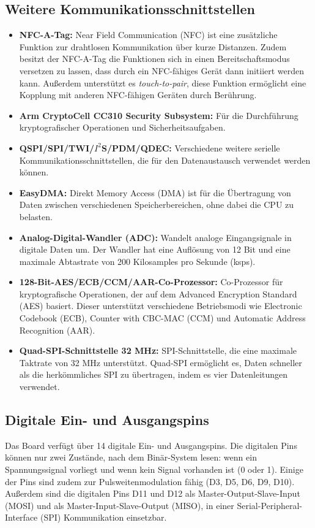 \subsection{Weitere Kommunikationsschnittstellen}
\cite{Ard.2024}\cite{NrdSem3.2024}
\begin{itemize}
	\item \textbf{NFC-A-Tag:} Near Field Communication (NFC) ist eine zusätzliche Funktion zur drahtlosen Kommunikation über kurze Distanzen. Zudem besitzt der NFC-A-Tag die Funktionen sich in einen Bereitschaftsmodus versetzen zu lassen, dass durch ein NFC-fähiges Gerät dann initiiert werden kann. Außerdem unterstützt es \textit{touch-to-pair}, diese Funktion ermöglicht eine Kopplung mit anderen NFC-fähigen Geräten durch Berührung.
	\item \textbf{Arm CryptoCell CC310 Security Subsystem:} Für die Durchführung kryptografischer Operationen und Sicherheitsaufgaben.\\ \cite{NrdSem.2024}
	\item \textbf{QSPI/SPI/TWI/$I^2$S/PDM/QDEC:} Verschiedene weitere serielle Kommunikationsschnittstellen, die für den Datenaustausch verwendet werden können.
	\item \textbf{EasyDMA:} Direkt Memory Access (DMA) ist für die Übertragung von Daten zwischen verschiedenen Speicherbereichen, ohne dabei die CPU zu belasten.\cite{Gehrke.2022}
	\item \textbf{Analog-Digital-Wandler (ADC):} Wandelt analoge Eingangsignale in digitale Daten um. Der Wandler hat eine Auflösung von 12 Bit und eine maximale Abtastrate von 200 Kilosamples pro Sekunde (ksps).
	\item \textbf{128-Bit-AES/ECB/CCM/AAR-Co-Prozessor:} Co-Prozessor für kryptografische Operationen, der auf dem Advanced Encryption Standard (AES) basiert. Dieser unterstützt verschiedene Betriebsmodi wie Electronic Codebook (ECB), Counter with CBC-MAC (CCM) und Automatic Address Recognition (AAR). \cite{NrdSem2.2024}
	\item \textbf{Quad-SPI-Schnittstelle 32 MHz:} SPI-Schnittstelle, die eine maximale Taktrate von 32 MHz unterstützt. Quad-SPI ermöglicht es, Daten schneller als die herkömmliches SPI zu übertragen, indem es vier Datenleitungen verwendet.\cite{NrdSem3.2023}
\end{itemize}

\subsection{Digitale Ein- und Ausgangspins}
Das Board verfügt über 14 digitale Ein- und Ausgangspins. Die digitalen Pins können nur zwei Zustände, nach dem Binär-System lesen: wenn ein Spannungssignal vorliegt und wenn kein Signal vorhanden ist (0 oder 1). Einige der Pins sind zudem zur Pulsweitenmodulation fähig (D3, D5, D6, D9, D10). Außerdem sind die digitalen Pins D11 und D12 als Master-Output-Slave-Input (MOSI) und als Master-Input-Slave-Output (MISO), in einer Serial-Peripheral-Interface (SPI) Kommunikation einsetzbar.\cite{Ard.2024}

